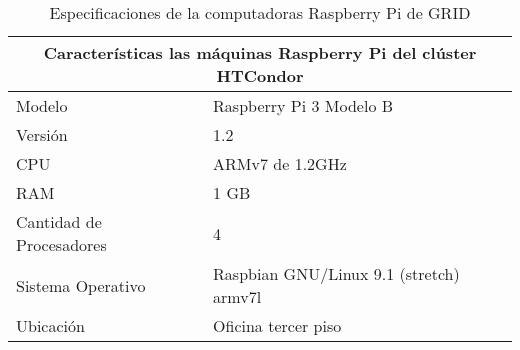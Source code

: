 
\begin{table}[h]
	\centering
	\begin{tabular}{|p{6cm}|p{8cm}|}
		\hline
		\multicolumn{2}{|c|}{\textbf{Características las máquinas Raspberry Pi del clúster HTCondor}} \\
		\hline
		Modelo                   & Raspberry Pi 3 Modelo B                                            \\
		\hline
		Versión                  & 1.2                                                                \\
		\hline
		CPU                      & ARMv7 de 1.2GHz                                                    \\
		\hline
		RAM                      & 1 GB                                                               \\
		\hline
		Cantidad de Procesadores & 4                                                                  \\
		\hline
		Sistema Operativo        & Raspbian GNU/Linux 9.1 (stretch) armv7l                            \\
		\hline
		Ubicación                & Oficina tercer piso                                                \\
		\hline
	\end{tabular}
	\caption{Especificaciones de la computadoras Raspberry Pi de GRID}
	\label{table:raspberries-pi-specs}
\end{table}



